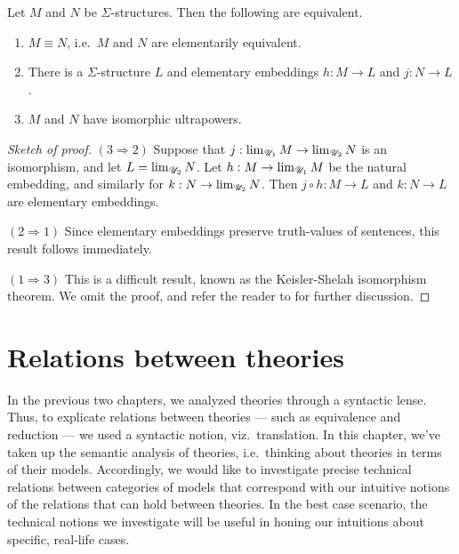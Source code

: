 \begin{prop} Let $M$ and $N$ be $\Sigma$-structures.  Then the
  following are equivalent. \begin{enumerate}
  \item $M\equiv N$, i.e.\ $M$ and $N$ are elementarily
    equivalent.
  \item There is a $\Sigma$-structure $L$ and elementary
    embeddings $h:M\to L$ and $j:N\to L$. 
  \item $M$ and $N$ have isomorphic ultrapowers.
  \end{enumerate} \label{prop:keisler} \end{prop}

\begin{proof}[Sketch of proof] $(3\Rightarrow 2)$ Suppose that
  $j:\lim _{\mathscr U _1}M\to \lim _{\mathscr U _2}N$ is an isomorphism, and let
  $L=\lim _{\mathscr U _2}N$.  Let $h:M\to \lim _{\mathscr U _1}M$ be the natural
  embedding, and similarly for $k:N\to \lim _{\mathscr U _2}N$.  Then
  $j\circ h:M\to L$ and $k:N\to L$ are elementary embeddings.

  $(2\Rightarrow 1)$ Since elementary embeddings preserve truth-values
  of sentences, this result follows immediately.

  $(1\Rightarrow 3)$ This is a difficult result, known as the
  Keisler-Shelah isomorphism theorem.  We omit the proof, and refer
  the reader to \cite{keisler-ult} for further
  discussion.  \end{proof}


\section{Relations between theories}

In the previous two chapters, we analyzed theories through a syntactic
lense.  Thus, to explicate relations between theories --- such as
equivalence and reduction --- we used a syntactic notion, viz.\
translation.  In this chapter, we've taken up the semantic analysis of
theories, i.e.\ thinking about theories in terms of their models.
Accordingly, we would like to investigate precise technical relations
between categories of models that correspond with our intuitive
notions of the relations that can hold between theories.  In the best
case scenario, the technical notions we investigate will be useful in
honing our intuitions about specific, real-life cases.

